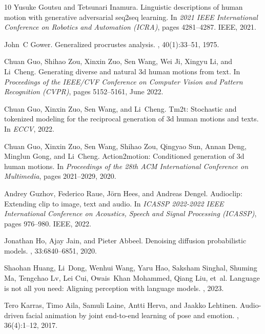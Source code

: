 \documentclass{article}
\begin{document}
{\begin{thebibliography}{10}
  Yusuke Goutsu and Tetsunari Inamura.
  \newblock Linguistic descriptions of human motion with generative adversarial
    seq2seq learning.
  \newblock In {\em 2021 IEEE International Conference on Robotics and Automation
    (ICRA)}, pages 4281--4287. IEEE, 2021.
  
  John~C Gower.
  \newblock Generalized procrustes analysis.
  , 40(1):33--51, 1975.
  
  Chuan Guo, Shihao Zou, Xinxin Zuo, Sen Wang, Wei Ji, Xingyu Li, and Li~Cheng.
  \newblock Generating diverse and natural 3d human motions from text.
  \newblock In {\em Proceedings of the IEEE/CVF Conference on Computer Vision and
    Pattern Recognition (CVPR)}, pages 5152--5161, June 2022.
  
  Chuan Guo, Xinxin Zuo, Sen Wang, and Li~Cheng.
  \newblock Tm2t: Stochastic and tokenized modeling for the reciprocal generation
    of 3d human motions and texts.
  \newblock In {\em ECCV}, 2022.
  
  Chuan Guo, Xinxin Zuo, Sen Wang, Shihao Zou, Qingyao Sun, Annan Deng, Minglun
    Gong, and Li~Cheng.
  \newblock Action2motion: Conditioned generation of 3d human motions.
  \newblock In {\em Proceedings of the 28th ACM International Conference on
    Multimedia}, pages 2021--2029, 2020.
  
  Andrey Guzhov, Federico Raue, J{\"o}rn Hees, and Andreas Dengel.
  \newblock Audioclip: Extending clip to image, text and audio.
  \newblock In {\em ICASSP 2022-2022 IEEE International Conference on Acoustics,
    Speech and Signal Processing (ICASSP)}, pages 976--980. IEEE, 2022.
  
  Jonathan Ho, Ajay Jain, and Pieter Abbeel.
  \newblock Denoising diffusion probabilistic models.
  ,
    33:6840--6851, 2020.
  
  Shaohan Huang, Li~Dong, Wenhui Wang, Yaru Hao, Saksham Singhal, Shuming Ma,
    Tengchao Lv, Lei Cui, Owais~Khan Mohammed, Qiang Liu, et~al.
  \newblock Language is not all you need: Aligning perception with language
    models.
  , 2023.
  
  Tero Karras, Timo Aila, Samuli Laine, Antti Herva, and Jaakko Lehtinen.
  \newblock Audio-driven facial animation by joint end-to-end learning of pose
    and emotion.
  , 36(4):1--12, 2017.
  

\end{thebibliography}}
\end{document}

